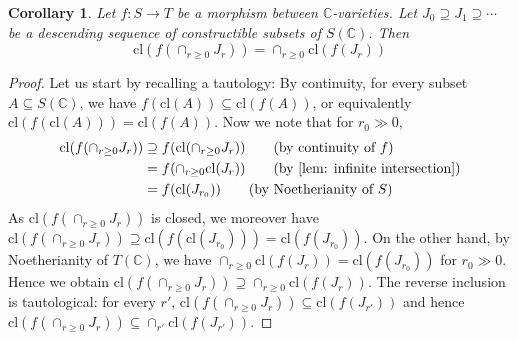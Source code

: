 \documentclass[10pt,a4paper]{amsart}
\newtheorem{corollary}{Corollary}
\newcommand{\IC}{\mathbb{C}}
\newcommand{\cl}{\mathrm{cl}}
\begin{document}
\begin{corollary}
\label{cor: project infinite intersection}
    Let $f : S \to T$ be a morphism between $\IC$-varieties. Let $J_0 \supseteq J_1 \supseteq \cdots$ be a descending sequence of constructible subsets of $S(\IC)$. Then 
    \begin{equation}
        \cl(f(\cap_{r \ge 0} J_r)) = \cap_{r \ge 0} \cl(f(J_r))
    \end{equation}
\end{corollary}

\begin{proof}
    Let us start by recalling a tautology: By continuity, for every subset $A \subseteq S(\IC)$, we have $f(\cl(A)) \subseteq \cl(f(A))$, or equivalently $\cl(f(\cl(A))) = \cl(f(A))$. Now we note that for $r_0 \gg 0$, 
    \begin{align*}
        \cl(f (\cap_{r \ge 0} J_r) ) &\supseteq f(\cl(\cap_{r \ge 0} J_r)) \tag{\textrm{by continuity of $f$}} \\
        &= f(\cap_{r \ge 0} \cl(J_r)) \tag{\textrm{by \cref{lem: infinite intersection}}} \\
        &=  f(\cl(J_{r_0})) \tag{\textrm{by Noetherianity of $S$}} 
    \end{align*}
    As $\cl(f (\cap_{r \ge 0} J_r))$ is closed, we moreover have $\cl(f (\cap_{r \ge 0} J_r)) \supseteq \cl(f(\cl(J_{r_0}))) = \cl(f(J_{r_0}))$. On the other hand, by Noetherianity of $T(\IC)$, we have $\cap_{r \ge 0} \cl(f(J_r)) =  \cl(f(J_{r_0}))$ for $r_0 \gg 0$. Hence we obtain $\cl(f (\cap_{r \ge 0} J_r)) \supseteq \cap_{r \ge 0} \cl(f(J_r))$. The reverse inclusion is tautological: for every $r'$, $\cl(f(\cap_{r \ge 0} J_r)) \subseteq \cl(f(J_{r'}))$ and hence $\cl(f(\cap_{r \ge 0} J_r)) \subseteq \cap_{r'} \cl(f(J_{r'}))$. 
\end{proof}
\end{document}
